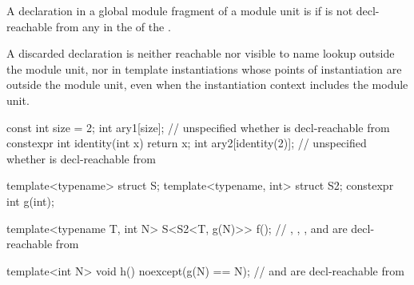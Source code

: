 \pnum
A declaration  in a global module fragment of a module unit
is  if 
is not decl-reachable from any 
in the 
of the .
\begin{note}
A discarded declaration is neither reachable
nor visible to name lookup outside the module unit,
nor in template instantiations whose points of instantiation
are outside the module unit,
even when the instantiation context
includes the module unit.
\end{note}

\pnum
\begin{example}
\begin{codeblock}
const int size = 2;
int ary1[size];                 // unspecified whether  is decl-reachable from 
constexpr int identity(int x) { return x; }
int ary2[identity(2)];          // unspecified whether  is decl-reachable from 

template<typename> struct S;
template<typename, int> struct S2;
constexpr int g(int);

template<typename T, int N>
S<S2<T, g(N)>> f();             // , , , and \tcode{::} are decl-reachable from 

template<int N>
void h() noexcept(g(N) == N);   //  and \tcode{::} are decl-reachable from 
\end{codeblock}
\end{example}

